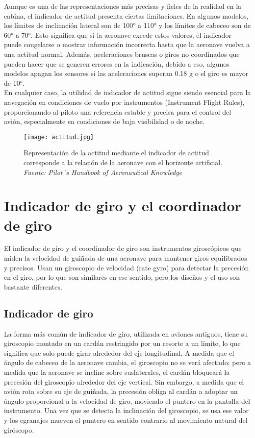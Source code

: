 Aunque es una de las representaciones más precisas y fieles de la realidad en la cabina, el indicador de actitud presenta ciertas limitaciones. En algunos modelos, los límites de inclinación lateral son de 100° a 110° y los límites de cabeceo son de 60° a 70°. Esto significa que si la aeronave excede estos valores, el indicador puede congelarse o mostrar información incorrecta hasta que la aeronave vuelva a una actitud normal. Además, aceleraciones bruscas o giros no coordinados que pueden hacer que se generen errores en la indicación, debido a eso, algunos modelos apagan los sensores si las aceleraciones superan 0.18 g o el giro es mayor de 10°.\\

En cualquier caso, la utilidad de indicador de actitud sigue siendo esencial para la navegación en condiciones de vuelo por instrumentos (Instrument Flight Rules), proporcionando al piloto una referencia estable y precisa para el control del avión, especialmente en condiciones de baja visibilidad o de noche.

\begin{figure}[H]
    \centering
    \texttt{[image: actitud.jpg]}
    \caption{\centering Representación de la actitud mediante el indicador de actitud corresponde a la relación de la aeronave con el horizonte artificial.\textit{ Fuente: Pilot´s Handbook of Aeronautical Knowledge}}
    \label{fig:placeholder}
\end{figure}

\section{Indicador de giro y el coordinador de giro}

El indicador de giro y el coordinador de giro son instrumentos giroscópicos que miden la velocidad de guiñada de una aeronave para mantener giros equilibrados y precisos. Usan un giroscopio de velocidad (rate gyro) para detectar la precesión en el giro, por lo que son similares en ese sentido, pero los diseños y el uso son bastante diferentes.

\subsection{Indicador de giro}
La forma más común de indicador de giro, utilizada en aviones antiguos, tiene su giroscopio montado en un cardán restringido por un resorte a un límite, lo que significa que solo puede girar alrededor del eje longitudinal. A medida que el ángulo de cabeceo de la aeronave cambia, el giroscopio no se verá afectado; pero a medida que la aeronave se incline sobre suslaterales, el cardán bloqueará la precesión del giroscopio alrededor del eje vertical. Sin embargo, a medida que el avión rota sobre su eje de guiñada, la precesión obliga al cardán a adoptar un ángulo proporcional a la velocidad de giro, moviendo el puntero en la pantalla del instrumento. Una vez que se detecta la inclinación del giroscopio, se usa ese valor y los egranajes mueven el puntero en sentido contrario al movimiento natural del giróscopo.\\


